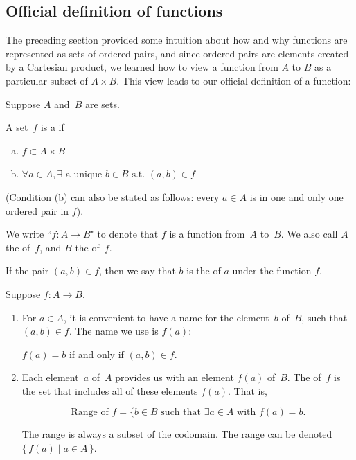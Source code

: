 \subsection{Official definition of functions}

The preceding section provided some intuition about how and why functions are represented as sets of ordered pairs, and since ordered pairs are elements created by a Cartesian product, we learned how to view a function from $A$ to $B$ as a particular subset of $A \times B$.  This view leads to our official definition of a function:

\begin{defn}{}
 Suppose $A$ and~$B$ are sets.

A set~$f$ is a 
 if
\begin{enumerate}[(a)]
\item \label{FunctionDefn-func-pair}
$f \subset A \times B$
\item \label{FunctionDefn-func-unique}
$\forall a \in A, \exists \mbox{ a unique } b \in B \mbox{ s.t. } (a, b) \in f$
\end{enumerate}

\noindent
(Condition (b) can also be stated as follows: every $a \in A$ is in one and only one ordered pair in $f$).  

We write ``$f \colon A \to B$" to denote that $f$ is a function from~$A$ to~$B$.
We also call
$A$  the  of~$f$, and
$B$ the  of~$f$.

If the pair $(a, b) \in f$, then we say that $b$ is the  of $a$ under the function $f$.


\end{defn}

\begin{notation}{} \label{FunctionNotation}
 Suppose $f \colon A \to B$. 
\begin{enumerate}
\item For $a \in A$, it is convenient to have a name for the element~$b$ of~$B$, such that $(a,b) \in f$. The name we use is $f(a)$:
\begin{center}
$f(a) = b$ if and only if $(a,b) \in f$.
\end{center}
\item \label{FunctionNotation-range}
 Each element~$a$ of~$A$ provides us with an element $f(a)$ of~$B$. The  of~$f$ is the set that includes all of these elements $f(a)$. That is,

\[ \mbox{Range of }f = \{b \in B \mbox{ such that } \exists a \in A \mbox{ with } f(a)=b.\]

The range is always a subset of the codomain. The range can be denoted $\{\, f(a) \mid a \in A \, \}$.
\end{enumerate}
\end{notation}

